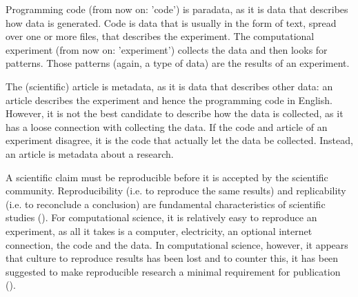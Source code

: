Programming code (from now on: 'code') is paradata, 
as it is data that describes how data is generated.
Code is data that is usually in the form of text, 
spread over one or more files, that describes the experiment.
The computational experiment (from now on: 'experiment') collects the data
and then looks for patterns.
Those patterns (again, a type of data) are the results of an experiment.

The (scientific) article is metadata, as it is data that describes other data:
an article describes the
experiment and hence the programming
code in English. However, it is not the best
candidate to describe how the data is collected,
as it has a loose connection with collecting the data.
If the code and article of an experiment disagree,
it is the code that actually let the data be collected.  
Instead, an article is metadata about a research.


A scientific claim must be reproducible before it is accepted
by the scientific community.
Reproducibility (i.e. to reproduce the same results) 
and replicability (i.e. to reconclude a conclusion)
are fundamental characteristics of scientific studies (\cite{patil2019visual}).
For computational science, it is relatively easy to 
reproduce an experiment, as all it takes is a computer, electricity,
an optional internet connection, the code and the data.
In computational science, however, it appears that 
culture to reproduce results has been lost 
and to counter this, it has been suggested to make
reproducible research a minimal requirement for 
publication (\cite{peng2011reproducible}).

